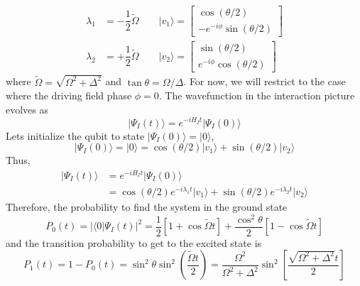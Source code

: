 \documentclass[aps,prl,onecolumn,notitlepage,showpacs,floatfix,superscriptaddress]{revtex4-1}
\begin{document}
\begin{equation}
\begin{split}
\lambda_1 &= -\dfrac{1}{2} \tilde{\Omega} \qquad \vert v_1 \rangle = \left[ \begin{array}{c}
\cos(\theta/2)  \\ 
-e^{-i\phi} \sin(\theta/2)
\end{array} \right] \\
\lambda_2 &= +\dfrac{1}{2} \tilde{\Omega} \qquad \vert v_2 \rangle = \left[ \begin{array}{c}
\sin(\theta/2)  \\ 
e^{-i\phi}\cos(\theta/2)
\end{array} \right] 
\end{split}
\end{equation}
where $\tilde{\Omega} = \sqrt{\Omega^2+\Delta^2}$ and $\tan\theta = \Omega/\Delta$. For now, we will restrict to the case where the driving field phase $\phi=0$. The wavefunction in the interaction picture evolves as
\begin{equation}
\vert \Psi_I(t) \rangle = e^{-iH_I t} \vert \Psi_I(0) \rangle
\end{equation}
Lets initialize the qubit to state $\vert \Psi_I(0) \rangle = \vert 0 \rangle$,
\begin{equation}
\vert \Psi_I(0) \rangle = \vert 0 \rangle = \cos(\theta/2) \vert v_1 \rangle + \sin(\theta/2) \vert v_2 \rangle 
\end{equation}
Thus,
\begin{equation}
\begin{split}
\vert \Psi_I(t) \rangle &= e^{-iH_I t} \vert \Psi_I(0) \rangle \\
&= \cos(\theta/2) e^{-i \lambda_1 t} \vert v_1 \rangle + \sin(\theta/2) e^{-i \lambda_2 t} \vert v_2 \rangle
\end{split}
\end{equation}
Therefore, the probability to find the system in the ground state
\begin{equation}
P_0 (t) = \vert \langle 0 \vert \Psi_I(t) \vert^2 = \dfrac{1}{2} [1+\cos\tilde{\Omega}t] + \dfrac{\cos^2\theta}{2} [1-\cos\tilde{\Omega}t]
\end{equation}
and the transition probability to get to the excited state is
\begin{equation}
P_1 (t) = 1-P_0 (t) = \sin^2\theta \sin^2\left( \dfrac{\tilde{\Omega}t}{2}\right) = \dfrac{\Omega^2}{\Omega^2+\Delta^2} \sin^2 \left[\dfrac{\sqrt{\Omega^2+\Delta^2}t}{2} \right]
\end{equation}
\end{document}
